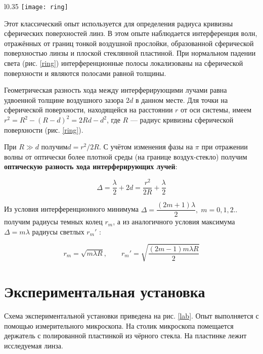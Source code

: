 \documentclass[12pt]{kiarticle} %
\begin{document}
	\begin{wrapfigure}{l}{0.35\linewidth} 
		\texttt{[image: ring]}
		\caption{Экспериментальная установка}
		\label{ring}
	\end{wrapfigure}

	Этот классический опыт используется для определения радиуса кривизны сферических поверхностей линз. В этом опыте наблюдается интерференция волн, отражённых от границ тонкой воздушной прослойки, образованной сферической поверхностью линзы и плоской стеклянной пластиной. При нормальном падении света (рис. \ref{ring}) интерференционные полосы локализованы на сферической поверхности и являются полосами равной толщины.
	
	Геометрическая разность хода между интерферирующими лучами равна удвоенной толщине воздушного зазора $ 2d $ в данном месте. Для точки на сферической поверхности, находящейся на расстоянии $ r $ от оси системы, имеем $ r^2 = R^2 - (R - d)^2 = 2Rd - d^2 $, где $ R $ --- радиус кривизны сферической поверхности (рис. \ref{ring}).
	
	При $ R \gg d $ получим$  d = r^2/2R $. С учётом изменения фазы на $ \pi $ при отражении волны от оптически более плотной среды (на границе воздух-стекло) получим \textbf{оптическую разность хода интерферирующих лучей}:
	
	\begin{equation}\label{r_m}
	\Delta = \dfrac{\lambda}{2} + 2d = \dfrac{r^2}{2R} + \dfrac{\lambda}{2}
	\end{equation}
	
	Из условия интерференционного минимума $ \Delta = \dfrac{(2m +1)\lambda}{2}, \; m =0, 1, 2.. $ получим радиусы темных колец $ r_m $, а из аналогичного условия максимума $ \Delta = m \lambda $ радиусы светлых $ r_m' $ :
	
	\begin{equation}\label{r_m'}
	r_m = \sqrt{m \lambda R}, \qquad 	r_m' = \sqrt{\dfrac{(2m-1)m \lambda R}{2}}
	\end{equation}
	
	\section{Экспериментальная установка}

Схема экспериментальной установки приведена на рис. \ref{lab}. Опыт выполняется с помощью измерительного микроскопа.
На столик микроскопа помещается держатель с полированной пластинкой из
чёрного стекла. На пластинке лежит исследуемая линза.
\end{document}
